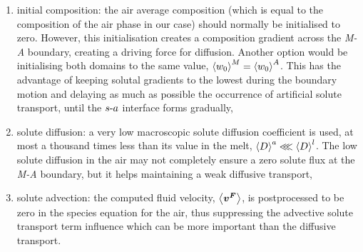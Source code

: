 \begin{enumerate}

	\item initial composition: 
	the air average composition (which is equal to the composition of the air phase in our case) 
	should normally be initialised to zero. However, this initialisation
	creates a composition gradient across the \emph{M-A} boundary, creating a driving force for diffusion. 
	Another option would be initialising both domains to the same value, $\left \langle {w}_0 \right \rangle^M=\left \langle {w}_0 \right \rangle^A$. 
	This has the advantage of keeping solutal gradients to the lowest during the boundary motion 
	and delaying as much as possible the occurrence of artificial solute transport, until the $s\text{-}a$ 
	interface forms gradually,
	
	\item solute diffusion: 
	a very low macroscopic solute diffusion coefficient is used, 
	at most a thousand times less than its value in the melt, $\left \langle D \right \rangle^a \lll \left \langle D \right \rangle^l$.
	The low solute diffusion in the air may not completely ensure a zero solute flux at 
	the \emph{M-A} boundary, but it helps maintaining a weak diffusive transport,

	\item solute advection: the computed fluid velocity, $\left \langle \boldsymbol{v^F} \right \rangle$, is postprocessed to be zero 
	in the species equation for the air, thus suppressing the advective solute transport term influence
	which can be more important than the diffusive transport.
	
\end{enumerate}


